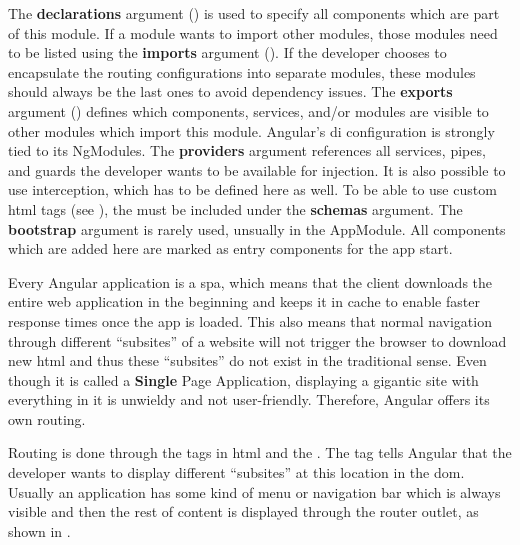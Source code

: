 The \textbf{declarations} argument () is used to specify all components which are part of this module. If a module wants to import other modules, those modules need to be listed using the \textbf{imports} argument (). If the developer chooses to encapsulate the routing configurations into separate modules, these modules should always be the last ones to avoid dependency issues. The \textbf{exports} argument () defines which components, services, and/or modules are visible to other modules which import this module. Angular's \gls{di} configuration is strongly tied to its NgModules. The \textbf{providers} argument references all services, pipes, and guards the developer wants to be available for injection. It is also possible to use interception, which has to be defined here as well. To be able to use custom \gls{html} tags (see ), the  must be included under the \textbf{schemas} argument. The \textbf{bootstrap} argument is rarely used, unsually in the AppModule. All components which are added here are marked as entry components for the app start.


Every Angular application is a \gls{spa}, which means that the client downloads the entire web application in the beginning and keeps it in cache to enable faster response times once the app is loaded. This also means that normal navigation through different \enquote{subsites} of a website will not trigger the browser to download new \gls{html} and thus these \enquote{subsites} do not exist in the traditional sense. Even though it is called a \textbf{Single} Page Application, displaying a gigantic site with everything in it is unwieldy and not user-friendly. Therefore, Angular offers its own routing.


Routing is done through the  tags in \gls{html} and the . The  tag tells Angular that the developer wants to display different \enquote{subsites} at this location in the \gls{dom}. Usually an application has some kind of menu or navigation bar which is always visible and then the rest of content is displayed through the router outlet, as shown in .

